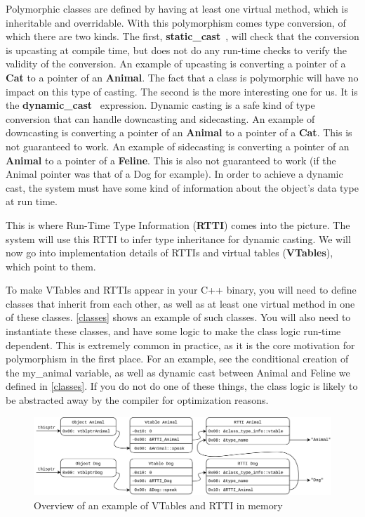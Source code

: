 \documentclass[a4paper,11pt,oneside]{report}
\begin{document}
Polymorphic classes are defined by having at least one virtual method, which is 
inheritable and overridable.
With this polymorphism comes type conversion, of which there are two kinds.
The first, \textbf{static\_cast}~\cite{staticcast}, will check that the
conversion is upcasting at compile time,
but does not do any run-time checks to verify the validity of the conversion.
An example of upcasting is converting a pointer of a \textbf{Cat} to a pointer
of an \textbf{Animal}.
The fact that a class is polymorphic will have no impact on this type of 
casting.
The second is the more interesting one for us. It is the 
\textbf{dynamic\_cast}~\cite{dynamiccast} expression.
Dynamic casting is a safe kind of type conversion that can handle downcasting 
and sidecasting.
An example of downcasting is converting a pointer of an \textbf{Animal} to a
pointer of a \textbf{Cat}. This is not guaranteed to work.
An example of sidecasting is converting a pointer of an \textbf{Animal} to a
pointer of a \textbf{Feline}. This is also not guaranteed to work (if the
Animal pointer was that of a Dog for example).
In order to achieve a dynamic cast, the system must have some kind of
information about the object's data type at run time.

This is where Run-Time Type Information (\textbf{RTTI}) comes into the picture.
The system will use this RTTI to infer type inheritance for dynamic casting.
We will now go into implementation details of RTTIs and virtual tables
(\textbf{VTables}), which point to them.

To make VTables and RTTIs appear in your C++ binary, you will need to define
classes that inherit from each other, as well as at least one virtual method
in one of these classes.
\autoref{classes} shows an example of such classes.
You will also need to instantiate these classes, and have some logic to make
the class logic run-time dependent. 
This is extremely common in practice, as it is the core motivation for
polymorphism in the first place.
For an example, see the conditional creation of the my\_animal variable, as
well as dynamic cast between Animal and Feline we defined in \autoref{classes}.
If you do not do one of these things, the class logic is likely to be abstracted
away by the compiler for optimization reasons.

\begin{figure}[h]

\includegraphics[width=16cm]{RTTI_graph.png}
\caption{Overview of an example of VTables and RTTI in memory}
\label{rttigraph}

\end{figure}
\end{document}
